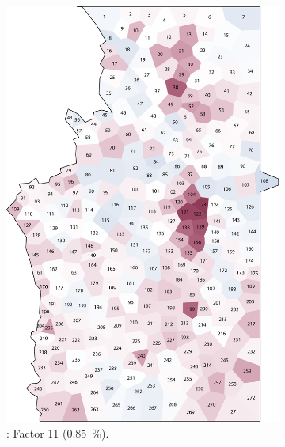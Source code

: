 \documentclass[output=paper]{LSP/langsci}
\begin{document}
\begin{figure}
\begin{subfigure}[t]{0.3\textwidth}
\includegraphics[width=\textwidth]{illustrations/pickl_fig10}
\caption{: Factor 11 (0.85~\%).}
\label{fig:10}
\end{subfigure}  
~
\begin{subfigure}[t]{0.3\textwidth}

\end{subfigure}
\end{figure}
\end{document}
